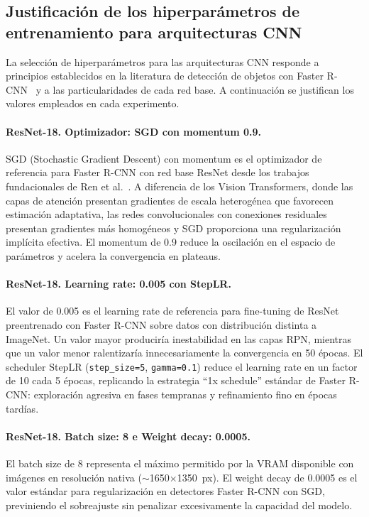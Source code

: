 \subsection{Justificación de los hiperparámetros de entrenamiento para arquitecturas CNN}
\label{subsec:justificacion_hiperparametros_cnn}

La selección de hiperparámetros para las arquitecturas CNN responde a principios establecidos en la literatura de detección de objetos con Faster R-CNN~\cite{ren_faster_2016} y a las particularidades de cada red base. A continuación se justifican los valores empleados en cada experimento.

\paragraph{ResNet-18. Optimizador: SGD con momentum 0.9.}
SGD (Stochastic Gradient Descent) con momentum es el optimizador de referencia para Faster R-CNN con red base ResNet desde los trabajos fundacionales de Ren et al.~\cite{ren_faster_2016}. A diferencia de los Vision Transformers, donde las capas de atención presentan gradientes de escala heterogénea que favorecen estimación adaptativa, las redes convolucionales con conexiones residuales presentan gradientes más homogéneos y SGD proporciona una regularización implícita efectiva. El momentum de 0.9 reduce la oscilación en el espacio de parámetros y acelera la convergencia en plateaus.

\paragraph{ResNet-18. Learning rate: 0.005 con StepLR.}
El valor de 0.005 es el learning rate de referencia para fine-tuning de ResNet preentrenado con Faster R-CNN sobre datos con distribución distinta a ImageNet. Un valor mayor produciría inestabilidad en las capas RPN, mientras que un valor menor ralentizaría innecesariamente la convergencia en 50 épocas. El scheduler StepLR (\texttt{step\_size=5}, \texttt{gamma=0.1}) reduce el learning rate en un factor de 10 cada 5 épocas, replicando la estrategia ``1x schedule'' estándar de Faster R-CNN: exploración agresiva en fases tempranas y refinamiento fino en épocas tardías.

\paragraph{ResNet-18. Batch size: 8 e Weight decay: 0.0005.}
El batch size de 8 representa el máximo permitido por la VRAM disponible con imágenes en resolución nativa ($\sim$1650$\times$1350~px). El weight decay de 0.0005 es el valor estándar para regularización en detectores Faster R-CNN con SGD, previniendo el sobreajuste sin penalizar excesivamente la capacidad del modelo.

